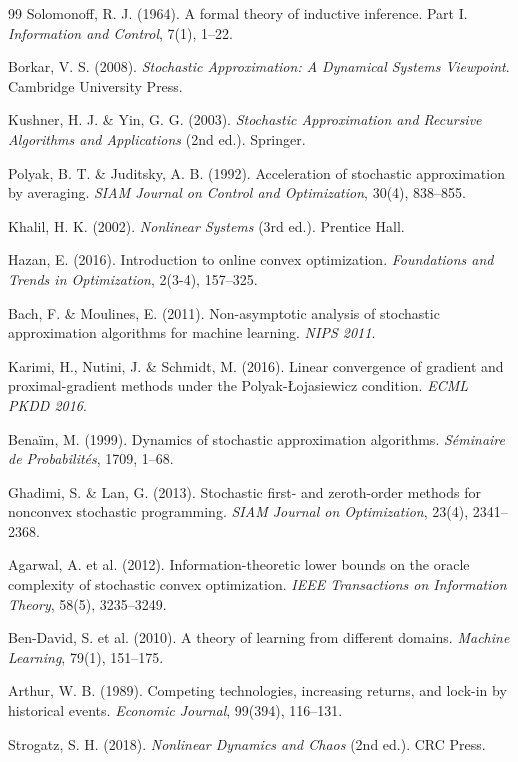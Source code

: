 \begin{thebibliography}{99}
Solomonoff, R. J. (1964).
A formal theory of inductive inference. Part I.
\emph{Information and Control}, 7(1), 1--22.

Borkar, V. S. (2008).
\emph{Stochastic Approximation: A Dynamical Systems Viewpoint}. Cambridge University Press.

Kushner, H. J. \& Yin, G. G. (2003).
\emph{Stochastic Approximation and Recursive Algorithms and Applications} (2nd ed.). Springer.

Polyak, B. T. \& Juditsky, A. B. (1992).
Acceleration of stochastic approximation by averaging.
\emph{SIAM Journal on Control and Optimization}, 30(4), 838--855.

Khalil, H. K. (2002).
\emph{Nonlinear Systems} (3rd ed.). Prentice Hall.

Hazan, E. (2016).
Introduction to online convex optimization.
\emph{Foundations and Trends in Optimization}, 2(3-4), 157--325.

Bach, F. \& Moulines, E. (2011).
Non-asymptotic analysis of stochastic approximation algorithms for machine learning.
\emph{NIPS 2011}.

Karimi, H., Nutini, J. \& Schmidt, M. (2016).
Linear convergence of gradient and proximal-gradient methods under the Polyak-{\L}ojasiewicz condition.
\emph{ECML PKDD 2016}.

Bena\"im, M. (1999).
Dynamics of stochastic approximation algorithms.
\emph{S\'eminaire de Probabilit\'es}, 1709, 1--68.

Ghadimi, S. \& Lan, G. (2013).
Stochastic first- and zeroth-order methods for nonconvex stochastic programming.
\emph{SIAM Journal on Optimization}, 23(4), 2341--2368.

Agarwal, A. et al. (2012).
Information-theoretic lower bounds on the oracle complexity of stochastic convex optimization.
\emph{IEEE Transactions on Information Theory}, 58(5), 3235--3249.

Ben-David, S. et al. (2010).
A theory of learning from different domains.
\emph{Machine Learning}, 79(1), 151--175.

Arthur, W. B. (1989).
Competing technologies, increasing returns, and lock-in by historical events.
\emph{Economic Journal}, 99(394), 116--131.

Strogatz, S. H. (2018).
\emph{Nonlinear Dynamics and Chaos} (2nd ed.). CRC Press.


\end{thebibliography}
